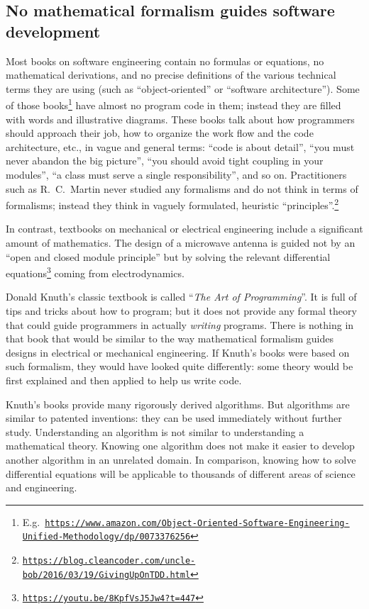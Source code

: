 \subsection{No mathematical formalism guides software development}

Most books on software engineering contain no formulas or equations,
no mathematical derivations, and no precise definitions of the various
technical terms they are using (such as ``object-oriented'' or ``software
architecture''). Some of those books\footnote{E.g.~\texttt{\href{https://www.amazon.com/Object-Oriented-Software-Engineering-Unified-Methodology/dp/0073376256}{https://www.amazon.com/Object-Oriented-Software-Engineering-Unified-Methodology/dp/0073376256}}}
have almost no program code in them; instead they are filled with
words and illustrative diagrams. These books talk about how programmers
should approach their job, how to organize the work flow and the code
architecture, etc., in vague and general terms: ``code is about detail'',
``you must never abandon the big picture'', ``you should avoid
tight coupling in your modules'', ``a class must serve a single
responsibility'', and so on. Practitioners such as R.\ C.\ Martin
never studied any formalisms and do not think in terms of formalisms;
instead they think in vaguely formulated, heuristic \textquotedblleft principles\textquotedblright .\footnote{\texttt{\href{https://blog.cleancoder.com/uncle-bob/2016/03/19/GivingUpOnTDD.html}{https://blog.cleancoder.com/uncle-bob/2016/03/19/GivingUpOnTDD.html}}}

In contrast, textbooks on mechanical or electrical engineering include
a significant amount of mathematics. The design of a microwave antenna
is guided not by an ``open and closed module principle'' but by
solving the relevant differential equations\footnote{\texttt{\href{https://youtu.be/8KpfVsJ5Jw4?t=447}{https://youtu.be/8KpfVsJ5Jw4?t=447}}}
coming from electrodynamics.

Donald Knuth's classic textbook is called ``\emph{The Art of Programming}''.
It is full of tips and tricks about how to program; but it does not
provide any formal theory that could guide programmers in actually
\emph{writing} programs. There is nothing in that book that would
be similar to the way mathematical formalism guides designs in electrical
or mechanical engineering. If Knuth's books were based on such formalism,
they would have looked quite differently: some theory would be first
explained and then applied to help us write code.

Knuth's books provide many rigorously derived algorithms. But algorithms
are similar to patented inventions: they can be used immediately without
further study. Understanding an algorithm is not similar to understanding
a mathematical theory. Knowing one algorithm does not make it easier
to develop another algorithm in an unrelated domain. In comparison,
knowing how to solve differential equations will be applicable to
thousands of different areas of science and engineering.

